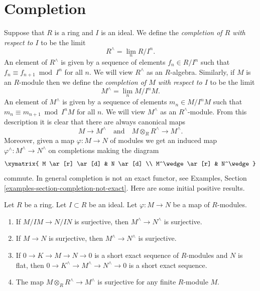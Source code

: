 \section{Completion}
\label{section-completion}

\noindent
Suppose that $R$ is a ring and $I$ is an ideal.
We define the {\it completion of $R$ with respect to $I$}
to be the limit
$$
R^\wedge = \lim_n R/I^n.
$$
An element of $R^\wedge$ is given by a sequence
of elements $f_n \in R/I^n$ such that $f_n \equiv f_{n + 1} \bmod I^n$
for all $n$. We will view $R^\wedge$ as an $R$-algebra.
Similarly, if $M$ is an $R$-module then we define the
{\it completion of $M$ with respect to $I$}
to be the limit
$$
M^\wedge = \lim_n M/I^nM.
$$
An element of $M^\wedge$ is given by a sequence of
elements $m_n \in M/I^nM$ such that $m_n \equiv m_{n + 1} \bmod I^nM$
for all $n$. We will view $M^\wedge$ as an $R^\wedge$-module.
From this description it is clear that there
are always canonical maps
$$
M \longrightarrow M^\wedge
\quad\text{and}\quad
M \otimes_R R^\wedge \longrightarrow M^\wedge.
$$
Moreover, given a map $\varphi : M \to N$ of modules we get an induced
map $\varphi^\wedge : M^\wedge \to N^\wedge$ on completions making the
diagram
$$
\xymatrix{
M \ar[r] \ar[d] & N \ar[d] \\
M^\wedge \ar[r] & N^\wedge
}
$$
commute. In general completion is not an exact functor, see
Examples, Section \ref{examples-section-completion-not-exact}.
Here are some initial positive results.

\begin{lemma}
\label{lemma-completion-generalities}
Let $R$ be a ring. Let $I \subset R$ be an ideal.
Let $\varphi : M \to N$ be a map of $R$-modules.
\begin{enumerate}
\item If $M/IM \to N/IN$ is surjective, then $M^\wedge \to N^\wedge$
is surjective.
\item If $M \to N$ is surjective, then $M^\wedge \to N^\wedge$ is surjective.
\item If $0 \to K \to M \to N \to 0$ is a short exact sequence of
$R$-modules and $N$ is flat, then
$0 \to K^\wedge \to M^\wedge \to N^\wedge \to 0$ is a short exact sequence.
\item The map $M \otimes_R R^\wedge \to M^\wedge$ is
surjective for any finite $R$-module $M$.
\end{enumerate}
\end{lemma}

